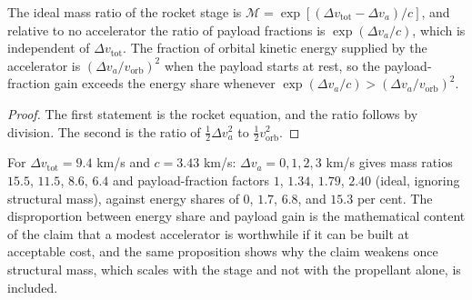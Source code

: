 \begin{proposition}
The ideal mass ratio of the rocket stage is $\mathcal M=\exp[(\Delta v_{\mathrm{tot}}-\Delta v_a)/c]$, and relative to no accelerator the ratio of payload fractions is $\exp(\Delta v_a/c)$, which is independent of $\Delta v_{\mathrm{tot}}$. The fraction of orbital kinetic energy supplied by the accelerator is $(\Delta v_a/v_{\mathrm{orb}})^2$ when the payload starts at rest, so the payload-fraction gain exceeds the energy share whenever $\exp(\Delta v_a/c)>(\Delta v_a/v_{\mathrm{orb}})^2$.
\end{proposition}

\begin{proof}
The first statement is the rocket equation, and the ratio follows by division. The second is the ratio of $\tfrac12\Delta v_a^2$ to $\tfrac12v_{\mathrm{orb}}^2$.
\end{proof}

For $\Delta v_{\mathrm{tot}}=9.4$ km/s and $c=3.43$ km/s: $\Delta v_a=0,1,2,3$ km/s gives mass ratios $15.5$, $11.5$, $8.6$, $6.4$ and payload-fraction factors $1$, $1.34$, $1.79$, $2.40$ (ideal, ignoring structural mass), against energy shares of $0$, $1.7$, $6.8$, and $15.3$ per cent. The disproportion between energy share and payload gain is the mathematical content of the claim that a modest accelerator is worthwhile if it can be built at acceptable cost, and the same proposition shows why the claim weakens once structural mass, which scales with the stage and not with the propellant alone, is included.
